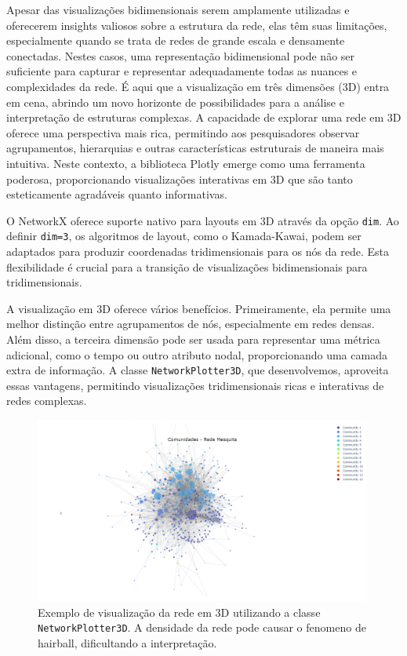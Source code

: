 Apesar das visualizações bidimensionais serem amplamente utilizadas e oferecerem insights valiosos sobre a estrutura da rede, elas têm suas limitações, especialmente quando se trata de redes de grande escala e densamente conectadas. Nestes casos, uma representação bidimensional pode não ser suficiente para capturar e representar adequadamente todas as nuances e complexidades da rede. É aqui que a visualização em três dimensões (3D) entra em cena, abrindo um novo horizonte de possibilidades para a análise e interpretação de estruturas complexas. A capacidade de explorar uma rede em 3D oferece uma perspectiva mais rica, permitindo aos pesquisadores observar agrupamentos, hierarquias e outras características estruturais de maneira mais intuitiva. Neste contexto, a biblioteca Plotly emerge como uma ferramenta poderosa, proporcionando visualizações interativas em 3D que são tanto esteticamente agradáveis quanto informativas.

O NetworkX oferece suporte nativo para layouts em 3D através da opção \texttt{dim}. Ao definir \texttt{dim=3}, os algoritmos de layout, como o Kamada-Kawai, podem ser adaptados para produzir coordenadas tridimensionais para os nós da rede. Esta flexibilidade é crucial para a transição de visualizações bidimensionais para tridimensionais.

A visualização em 3D oferece vários benefícios. Primeiramente, ela permite uma melhor distinção entre agrupamentos de nós, especialmente em redes densas. Além disso, a terceira dimensão pode ser usada para representar uma métrica adicional, como o tempo ou outro atributo nodal, proporcionando uma camada extra de informação. A classe \texttt{NetworkPlotter3D}, que desenvolvemos, aproveita essas vantagens, permitindo visualizações tridimensionais ricas e interativas de redes complexas.

\begin{figure}[h]
\centering
\includegraphics[width=0.99\textwidth]{images/3d_plot_example.png}
\caption{Exemplo de visualização da rede em 3D utilizando a classe \texttt{NetworkPlotter3D}. A densidade da rede pode causar o fenomeno de hairball, dificultando a interpretação.}
\label{fig:3d_plot_example}
\fautor
\end{figure}

